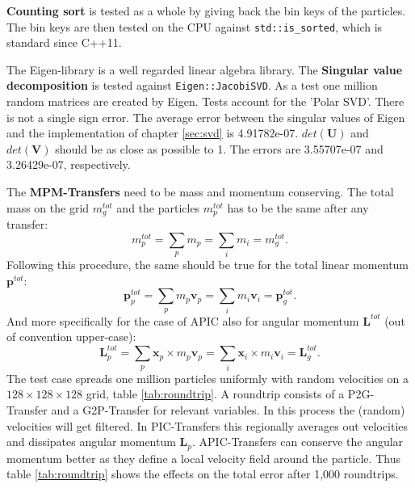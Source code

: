 \documentclass[m,times]{cgMA}
\begin{document}
\textbf{Counting sort} is tested as a whole by giving back the bin keys of the particles. The bin keys are then tested on the CPU against \texttt{std::is\_sorted}, which is standard since C++11.

The Eigen-library \cite{EIGEN:LIBRARY} is a well regarded linear algebra library. The \textbf{Singular value decomposition} is tested against \texttt{Eigen::JacobiSVD}. As a test one million random matrices are created by Eigen. Tests account for the 'Polar SVD'. There is not a single sign error. The average error between the singular values of Eigen and the implementation of chapter \ref{sec:svd} is 4.91782e-07. $det(\boldsymbol{U})$ and $det(\boldsymbol{V})$ should be as close as possible to 1. The errors are 3.55707e-07 and 3.26429e-07, respectively.

The \textbf{MPM-Transfers} need to be mass and momentum conserving. The total mass on the grid $m_g^{tot}$ and the particles $m_p^{tot}$ has to be the same after any transfer:
\begin{equation}
  m_{p}^{tot}= \sum_p m_p =  \sum_i m_i = m_{g}^{tot}.
\end{equation}
Following this procedure, the same should be true for the total linear momentum $\boldsymbol{p}^{tot}$:
\begin{equation}
  \boldsymbol{p}_{p}^{tot}= \sum_p m_p \boldsymbol{v}_p=  \sum_i m_i \boldsymbol{v}_i = \boldsymbol{p}_{g}^{tot}.
\end{equation}
And more specifically for the case of APIC also for angular momentum $\boldsymbol{L}^{tot}$ (out of convention upper-case):
\begin{equation}
  \boldsymbol{L}_{p}^{tot}= \sum_p \boldsymbol{x}_p \times m_p \boldsymbol{v}_p =  \sum_i \boldsymbol{x}_i \times m_i \boldsymbol{v}_i = \boldsymbol{L}_{g}^{tot}.
\end{equation}
The test case spreads one million particles uniformly with random velocities on a $128\times128\times128$ grid, table \ref{tab:roundtrip}. A roundtrip consists of a P2G-Transfer and a G2P-Transfer for relevant variables. In this process the (random) velocities will get filtered. In PIC-Transfers this regionally averages out velocities and dissipates angular momentum $\boldsymbol{L}_p$. APIC-Transfers can conserve the angular momentum better as they define a local velocity field around the particle. Thus table \ref{tab:roundtrip} shows the effects on the total error after 1,000 roundtrips.
\end{document}
